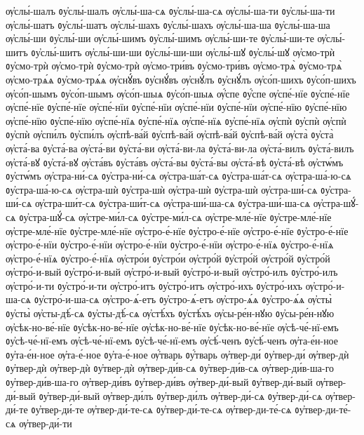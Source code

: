 {ѹ҆слы́-шалъ
ᲂу҆слы́-шалъ
ѹ҆слы́-ша-сѧ
ᲂу҆слы́-ша-сѧ
ѹ҆слы́-ша-ти
ᲂу҆слы́-ша-ти
ѹ҆слы́-шатъ
ᲂу҆слы́-шатъ
ѹ҆слы́-шахъ
ᲂу҆слы́-шахъ
ѹ҆слы́-ша-ша
ᲂу҆слы́-ша-ша
ѹ҆слы́-ши
ᲂу҆слы́-ши
ѹ҆слы́-шимъ
ᲂу҆слы́-шимъ
ѹ҆слы́-ши-те
ᲂу҆слы́-ши-те
ѹ҆слы́-шитъ
ᲂу҆слы́-шитъ
ѹ҆слы́-ши-ши
ᲂу҆слы́-ши-ши
ѹ҆слы́-шꙋ
ᲂу҆слы́-шꙋ
ѹ҆смо-трѝ
ᲂу҆смо-трѝ
ѹ҆смо-трѝ
ᲂу҆смо-трѝ
ѹ҆смо-три́въ
ᲂу҆смо-три́въ
ѹ҆смо-трѧ̀
ᲂу҆смо-трѧ̀
ѹ҆смо-трѧ́ѧ
ᲂу҆смо-трѧ́ѧ
ѹ҆снꙋ́въ
ᲂу҆снꙋ́въ
ѹ҆снꙋ́лъ
ᲂу҆снꙋ́лъ
ѹ҆со́п-шихъ
ᲂу҆со́п-шихъ
ѹ҆со́п-шымъ
ᲂу҆со́п-шымъ
ѹ҆со́п-шыѧ
ᲂу҆со́п-шыѧ
ѹ҆́спе
ᲂу҆́спе
ѹ҆спе́-нїе
ᲂу҆спе́-нїе
ѹ҆спе́-нїе
ᲂу҆спе́-нїе
ѹ҆спе́-нїи
ᲂу҆спе́-нїи
ѹ҆спе́-нїи
ᲂу҆спе́-нїи
ѹ҆спе́-нїю
ᲂу҆спе́-нїю
ѹ҆спе́-нїю
ᲂу҆спе́-нїю
ѹ҆спе́-нїѧ
ᲂу҆спе́-нїѧ
ѹ҆спе́-нїѧ
ᲂу҆спе́-нїѧ
ѹ҆спѝ
ᲂу҆спѝ
ѹ҆спѝ
ᲂу҆спѝ
ѹ҆спи́лъ
ᲂу҆спи́лъ
ѹ҆спѣ-ва́й
ᲂу҆спѣ-ва́й
ѹ҆спѣ-ва́й
ᲂу҆спѣ-ва́й
ѹ҆ста̀
ᲂу҆ста̀
ѹ҆ста́-ва
ᲂу҆ста́-ва
ѹ҆ста́-ви
ᲂу҆ста́-ви
ѹ҆ста́-ви-ла
ᲂу҆ста́-ви-ла
ѹ҆ста́-вилъ
ᲂу҆ста́-вилъ
ѹ҆ста́-вꙋ
ᲂу҆ста́-вꙋ
ѹ҆ста́въ
ᲂу҆ста́въ
ѹ҆ста́-вы
ᲂу҆ста́-вы
ѹ҆ста́-вѣ
ᲂу҆ста́-вѣ
ѹ҆стѡ́мъ
ᲂу҆стѡ́мъ
ѹ҆стра-ни́-сѧ
ᲂу҆стра-ни́-сѧ
ѹ҆стра-ша́т-сѧ
ᲂу҆стра-ша́т-сѧ
ѹ҆стра-ша́-ю-сѧ
ᲂу҆стра-ша́-ю-сѧ
ѹ҆стра-шѝ
ᲂу҆стра-шѝ
ѹ҆стра-шѝ
ᲂу҆стра-шѝ
ѹ҆стра-ши́-сѧ
ᲂу҆стра-ши́-сѧ
ѹ҆стра-ши́т-сѧ
ᲂу҆стра-ши́т-сѧ
ѹ҆стра-ши́-ша-сѧ
ᲂу҆стра-ши́-ша-сѧ
ѹ҆стра-шꙋ́-сѧ
ᲂу҆стра-шꙋ́-сѧ
ѹ҆стре-ми́л-сѧ
ᲂу҆стре-ми́л-сѧ
ѹ҆стре-мле́-нїе
ᲂу҆стре-мле́-нїе
ѹ҆стре-мле́-нїе
ᲂу҆стре-мле́-нїе
ѹ҆стро-е́-нїе
ᲂу҆стро-е́-нїе
ѹ҆стро-е́-нїе
ᲂу҆стро-е́-нїе
ѹ҆стро-е́-нїи
ᲂу҆стро-е́-нїи
ѹ҆стро-е́-нїи
ᲂу҆стро-е́-нїи
ѹ҆стро-е́-нїѧ
ᲂу҆стро-е́-нїѧ
ѹ҆стро-е́-нїѧ
ᲂу҆стро-е́-нїѧ
ѹ҆стро́и
ᲂу҆стро́и
ѹ҆стро́й
ᲂу҆стро́й
ѹ҆стро́й
ᲂу҆стро́й
ѹ҆стро́-и-вый
ᲂу҆стро́-и-вый
ѹ҆стро́-и-вый
ᲂу҆стро́-и-вый
ѹ҆стро́-илъ
ᲂу҆стро́-илъ
ѹ҆стро́-и-ти
ᲂу҆стро́-и-ти
ѹ҆стро́-итъ
ᲂу҆стро́-итъ
ѹ҆стро́-ихъ
ᲂу҆стро́-ихъ
ѹ҆стро́-и-ша-сѧ
ᲂу҆стро́-и-ша-сѧ
ѹ҆стро-ѧ́-етъ
ᲂу҆стро-ѧ́-етъ
ѹ҆стро-ѧ́ѧ
ᲂу҆стро-ѧ́ѧ
ѹ҆сты̀
ᲂу҆сты̀
ѹ҆сты-дѣ́-сѧ
ᲂу҆сты-дѣ́-сѧ
ѹ҆стѣ́хъ
ᲂу҆стѣ́хъ
ѹ҆сы-ре́н-нꙋю
ᲂу҆сы-ре́н-нꙋю
ѹ҆сѣк-но-ве́-нїе
ᲂу҆сѣк-но-ве́-нїе
ѹ҆сѣк-но-ве́-нїе
ᲂу҆сѣк-но-ве́-нїе
ѹ҆сѣ-че́-нї-емъ
ᲂу҆сѣ-че́-нї-емъ
ѹ҆сѣ-че́-нї-емъ
ᲂу҆сѣ-че́-нї-емъ
ѹ҆сѣ́-ченъ
ᲂу҆сѣ́-ченъ
ѹ҆та-е́н-ное
ᲂу҆та-е́н-ное
ѹ҆та-е́-ное
ᲂу҆та-е́-ное
ѹ҆́тварь
ᲂу҆́тварь
ѹ҆твер-ди́
ᲂу҆твер-ди́
ѹ҆твер-дѝ
ᲂу҆твер-дѝ
ѹ҆твер-дѝ
ᲂу҆твер-дѝ
ѹ҆твер-ди́в-сѧ
ᲂу҆твер-ди́в-сѧ
ѹ҆твер-ди́в-ша-го
ᲂу҆твер-ди́в-ша-го
ѹ҆твер-ди́въ
ᲂу҆твер-ди́въ
ѹ҆твер-ди́-вый
ᲂу҆твер-ди́-вый
ѹ҆твер-ди́-вый
ᲂу҆твер-ди́-вый
ѹ҆твер-ди́лъ
ᲂу҆твер-ди́лъ
ѹ҆твер-ди́-сѧ
ᲂу҆твер-ди́-сѧ
ѹ҆твер-ди́-те
ᲂу҆твер-ди́-те
ѹ҆твер-ди́-те-сѧ
ᲂу҆твер-ди́-те-сѧ
ѹ҆твер-ди-те́-сѧ
ᲂу҆твер-ди-те́-сѧ
ѹ҆твер-ди́-ти
}
